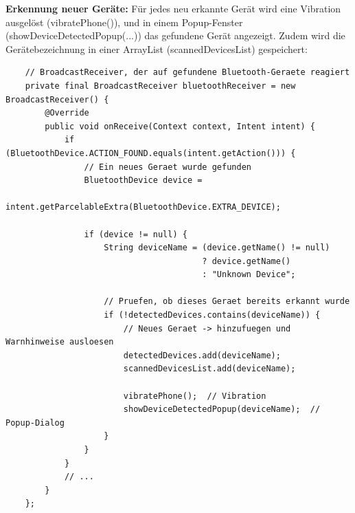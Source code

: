 \documentclass[a4paper, 12pt]{article} %
\begin{document}
\begin{spacing}{1.8}
\textbf{Erkennung neuer Geräte\cite{lukiano12_lkw_assist}:} Für jedes neu erkannte Gerät wird eine Vibration ausgelöst (vibratePhone()), 
und in einem Popup-Fenster (showDeviceDetectedPopup(...)) das gefundene Gerät angezeigt. Zudem wird die Gerätebezeichnung in einer ArrayList (scannedDevicesList) gespeichert:

\begin{lstlisting}
    // BroadcastReceiver, der auf gefundene Bluetooth-Geraete reagiert
    private final BroadcastReceiver bluetoothReceiver = new BroadcastReceiver() {
        @Override
        public void onReceive(Context context, Intent intent) {
            if (BluetoothDevice.ACTION_FOUND.equals(intent.getAction())) {
                // Ein neues Geraet wurde gefunden
                BluetoothDevice device =
                        intent.getParcelableExtra(BluetoothDevice.EXTRA_DEVICE);
    
                if (device != null) {
                    String deviceName = (device.getName() != null)
                                        ? device.getName()
                                        : "Unknown Device";
    
                    // Pruefen, ob dieses Geraet bereits erkannt wurde
                    if (!detectedDevices.contains(deviceName)) {
                        // Neues Geraet -> hinzufuegen und Warnhinweise ausloesen
                        detectedDevices.add(deviceName);
                        scannedDevicesList.add(deviceName);
    
                        vibratePhone();  // Vibration
                        showDeviceDetectedPopup(deviceName);  // Popup-Dialog
                    }
                }
            }
            // ...
        }
    };
    \end{lstlisting}


\end{spacing}
\end{document}
